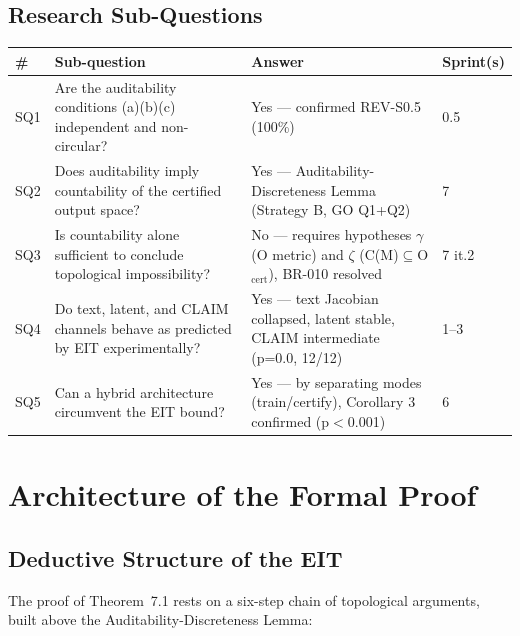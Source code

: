 \documentclass[11pt,a4paper]{article}
\theoremstyle{plain}
\begin{document}
\subsection{Research Sub-Questions}

\begin{longtable}{p{0.5cm}p{6.5cm}p{4cm}p{1.5cm}}
\toprule
\# & Sub-question & Answer & Sprint(s) \\
\midrule
SQ1 & Are the auditability conditions (a)(b)(c) independent and non-circular? &
Yes --- confirmed REV-S0.5 (100\%) & 0.5 \\
SQ2 & Does auditability imply countability of the certified output space? &
Yes --- Auditability-Discreteness Lemma (Strategy B, GO Q1+Q2) & 7 \\
SQ3 & Is countability alone sufficient to conclude topological impossibility? &
No --- requires hypotheses $\gamma$ (O metric) and $\zeta$ (C(M)$\subseteq$O$_\text{cert}$), BR-010 resolved & 7 it.2 \\
SQ4 & Do text, latent, and CLAIM channels behave as predicted by EIT experimentally? &
Yes --- text Jacobian collapsed, latent stable, CLAIM intermediate (p=0.0, 12/12) & 1--3 \\
SQ5 & Can a hybrid architecture circumvent the EIT bound? &
Yes --- by separating modes (train/certify), Corollary 3 confirmed (p$<$0.001) & 6 \\
\bottomrule
\end{longtable}

\section{Architecture of the Formal Proof}

\subsection{Deductive Structure of the EIT}

The proof of Theorem~7.1 rests on a six-step chain of topological arguments, built
above the Auditability-Discreteness Lemma:
\end{document}
